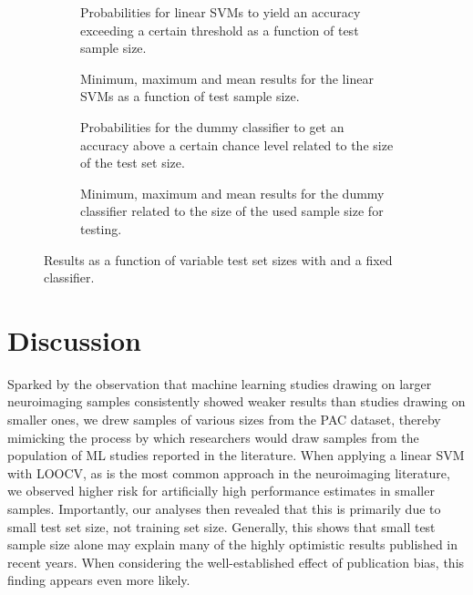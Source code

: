 \documentclass{article}
\begin{document}
    \begin{figure}
        \captionsetup[subfigure]{justification=justified,singlelinecheck=false}
        \begin{subfigure}[t]{0.61\textwidth}
            
            \caption{Probabilities for linear SVMs to yield an accuracy exceeding a certain threshold as a function of test sample size.}
        \end{subfigure}
        \hspace{3.0mm}
        \begin{subfigure}[t]{0.34\textwidth}
            
            \caption{Minimum, maximum and mean results for the linear SVMs as a function of test sample size.}
        \end{subfigure}

        \vspace{3.0mm}

        \begin{subfigure}[t]{0.61\textwidth}
            
            \caption{Probabilities for the dummy classifier to get an accuracy above a certain chance level related to the size of the test set size.}
        \end{subfigure}
        \hspace{3.0mm}
        \begin{subfigure}[t]{0.34\textwidth}
            
            \caption{Minimum, maximum and mean results for the dummy classifier related to the size of the used sample size for testing.}
        \end{subfigure}
        \caption{Results as a function of variable test set sizes with and a fixed classifier.}
        \label{fig:test_sample_size_effects}
    \end{figure}



    \section{Discussion}


    Sparked by the observation that machine learning studies drawing on larger neuroimaging samples consistently showed weaker results than studies drawing on smaller ones, we drew samples of various sizes from the PAC dataset, thereby mimicking the process by which researchers would draw samples from the population of ML studies reported in the literature. When applying a linear SVM with LOOCV, as is the most common approach in the neuroimaging literature\cite{Arbabshirani2017}, we observed higher risk for artificially high performance estimates in smaller samples. Importantly, our analyses then revealed that this is primarily due to small test set size, not training set size. Generally, this shows that small test sample size alone may explain many of the highly optimistic results published in recent years. When considering the well-established effect of publication bias, this finding appears even more likely.
\end{document}

